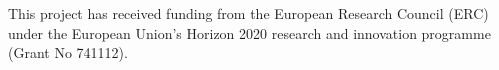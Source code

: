 \documentclass[hess, twostagejnl]{copernicus}
\begin{document}






\begin{acknowledgements}
This project has received funding from the European Research Council (ERC) under the European Union’s Horizon 2020 research and innovation programme (Grant No 741112).

\end{acknowledgements}






%
%
%

 
 





\end{document}
